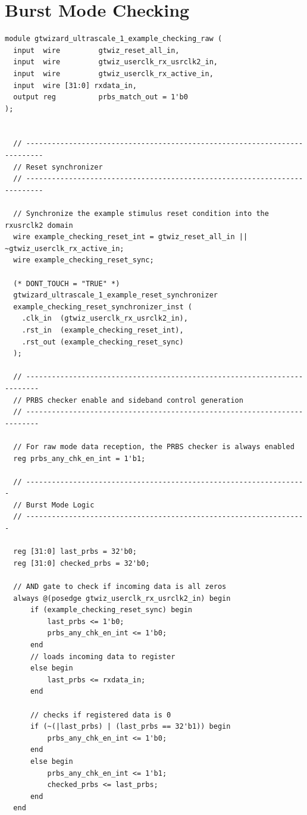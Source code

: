 \documentclass[oneside]{discothesis}
\begin{document}
\section{Burst Mode Checking}%
\label{sec:burst_mode_checking}
\begin{verbatim}
module gtwizard_ultrascale_1_example_checking_raw (
  input  wire         gtwiz_reset_all_in,
  input  wire         gtwiz_userclk_rx_usrclk2_in,
  input  wire         gtwiz_userclk_rx_active_in,
  input  wire [31:0] rxdata_in,
  output reg          prbs_match_out = 1'b0
);


  // --------------------------------------------------------------------------
  // Reset synchronizer
  // --------------------------------------------------------------------------

  // Synchronize the example stimulus reset condition into the rxusrclk2 domain
  wire example_checking_reset_int = gtwiz_reset_all_in || ~gtwiz_userclk_rx_active_in;
  wire example_checking_reset_sync;

  (* DONT_TOUCH = "TRUE" *)
  gtwizard_ultrascale_1_example_reset_synchronizer
  example_checking_reset_synchronizer_inst (
    .clk_in  (gtwiz_userclk_rx_usrclk2_in),
    .rst_in  (example_checking_reset_int),
    .rst_out (example_checking_reset_sync)
  );

  // -------------------------------------------------------------------------
  // PRBS checker enable and sideband control generation
  // -------------------------------------------------------------------------

  // For raw mode data reception, the PRBS checker is always enabled
  reg prbs_any_chk_en_int = 1'b1;

  // ------------------------------------------------------------------
  // Burst Mode Logic
  // ------------------------------------------------------------------

  reg [31:0] last_prbs = 32'b0;
  reg [31:0] checked_prbs = 32'b0;

  // AND gate to check if incoming data is all zeros
  always @(posedge gtwiz_userclk_rx_usrclk2_in) begin
      if (example_checking_reset_sync) begin
          last_prbs <= 1'b0;
          prbs_any_chk_en_int <= 1'b0;
      end
      // loads incoming data to register
      else begin
          last_prbs <= rxdata_in;
      end

      // checks if registered data is 0 
      if (~(|last_prbs) | (last_prbs == 32'b1)) begin
          prbs_any_chk_en_int <= 1'b0;
      end
      else begin
          prbs_any_chk_en_int <= 1'b1;
          checked_prbs <= last_prbs;
      end
  end



\end{verbatim}
\end{document}

